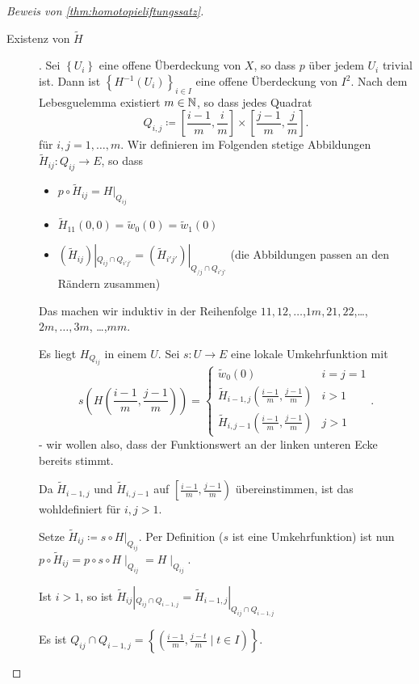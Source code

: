 \begin{proof}[Beweis von \autoref{thm:homotopieliftungssatz}]
    \begin{description}
        \item[Existenz von $\tilde{H}$]. Sei $\left \{U_i\right\} $ eine offene Überdeckung von $X$, so dass  $p$ über jedem  $U_i$ trivial ist. Dann ist  $\left \{H^{-1}(U_i)\right\} _{i \in I}$ eine offene Überdeckung von $I^2$. Nach dem Lebesguelemma existiert $m\in \mathbb{N}$, so dass jedes Quadrat
            \[
            Q_{i,j} \coloneqq  \left[ \frac{i-1}{m}, \frac{i}{m} \right] \times \left[ \frac{j-1}{m}, \frac{j}{m} \right] 
            .\] 
            für $i,j = 1,\ldots,m$.
            Wir definieren im Folgenden stetige Abbildungen $\tilde{H}_{ij}\colon  Q_{ij} \to  E$, so dass
            \begin{itemize}
                \item $ p \circ  \tilde{H}_{ij} = H|_{Q_{ij}}$ 
                \item $\tilde{H}_{11}(0,0) = \tilde{w}_0(0) = \tilde{w}_1(0)$
                \item $(\tilde{H}_{ij})|_{Q_{ij} \cap  Q_{i'j'}} = (\tilde{H}_{i'j'})|_{Q_{/j} \cap  Q_{i'j'}}$ (die Abbildungen passen an den Rändern zusammen)
            \end{itemize}
    Das machen wir induktiv in der Reihenfolge $11,12,\ldots$,$1m, 21,22$,\ldots,$2m, \ldots, 3m$, \ldots,$mm$.

    Es liegt $H_{Q_{ij}}$ in einem $U$. Sei  $s\colon  U \to  E$ eine lokale Umkehrfunktion mit
    \[
        s\left(H\left( \frac{i-1}{m}, \frac{j-1}{m} \right) \right) = \begin{cases}
            \tilde{w}_0(0) & i=j=1 \\
            \tilde{H}_{i-1,j}\left( \frac{i-1}{m}, \frac{j-1}{m} \right) & i>1 \\
            \tilde{H}_{i,j-1}\left( \frac{i-1}{m}, \frac{j-1}{m} \right) & j>1
        \end{cases}
    .\] 
    - wir wollen also, dass der Funktionswert an der linken unteren Ecke bereits stimmt.
    \begin{remark}
        Da $\tilde{H}_{i-1,j}$ und $ \tilde{H}_{i,j-1}$ auf $\left[ \frac{i-1}{m}, \frac{j-1}{m} \right) $ übereinstimmen, ist das wohldefiniert für $i,j > 1$.
    \end{remark}
    Setze $\tilde{H}_{ij}\coloneqq  s \circ  H|_{Q_{ij}}$. Per Definition ($s$ ist eine Umkehrfunktion) ist nun  $p \circ  \tilde{H}_{ij} = p \circ  s \circ  H\mid _{Q_{ij}} = H\mid _{Q_{ij}}$.
    \begin{claim}
        Ist $i>1$, so ist  $\tilde{H}_{ij}|_{Q_{ij} \cap  Q_{i-1,j}} = \tilde{H}_{i-1,j} |_{Q_{ij} \cap Q_{i-1,j}}$
    \end{claim}
    \begin{subproof}
        Es ist $Q_{ij} \cap  Q_{i-1,j} = \left \{\left( \frac{i-1}{m}, \frac{j-t}{m} \mid t\in I \right) \right\} $.
        

\end{subproof}
\end{description}
\end{proof}
